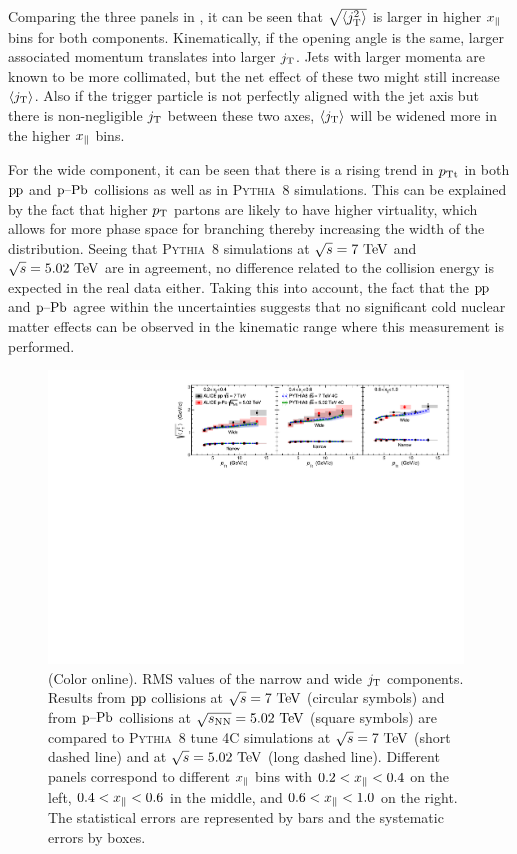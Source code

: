 Comparing the three panels in , it can be seen that $\sqrt{\left<j_{\rm T}^2\right>}$ is larger in higher $x_{\parallel}$ bins for both components. Kinematically, if the opening angle is the same, larger associated momentum translates into larger $j_{\rm T}$. Jets with larger momenta are known to be more collimated, but the net effect of these two might still increase $\left<j_{\rm T}\right>$. Also if the trigger particle is not perfectly aligned with the jet axis but there is non-negligible $j_{\rm T}$ between these two axes, $\left<j_{\rm T}\right>$ will be widened more in the higher $x_{\parallel}$ bins.

For the wide component, it can be seen that there is a rising trend in $p_{\rm Tt}$ in both $\mbox{p\kern-0.05em p}$ and $\mbox{p--Pb}$ collisions as well as in \textsc{Pythia}~8 simulations. This can be explained by the fact that higher $p_{\rm T}$ partons are likely to have higher virtuality, which allows for more phase space for branching thereby increasing the width of the distribution. Seeing that \textsc{Pythia}~8 simulations at $\sqrt{s} = 7~\mathrm{TeV}$ and $\sqrt{s} = 5.02~\mathrm{TeV}$ are in agreement, no difference related to the collision energy is expected in the real data either. Taking this into account, the fact that the $\mbox{p\kern-0.05em p}$ and $\mbox{p--Pb}$ agree within the uncertainties suggests that no significant cold nuclear matter effects can be observed in the kinematic range where this measurement is performed.

  \begin{figure}[t]
    \begin{center}
      \includegraphics[width = 0.98\textwidth]{figures/results/jt_RMS_finalFormUniformTextSize}
    \end{center}
    \caption{(Color online). RMS values of the narrow and wide $j_{\rm T}$ components. Results from $\mbox{p\kern-0.05em p}$ collisions at $\sqrt{s} = 7~\mathrm{TeV}$ (circular symbols) and from $\mbox{p--Pb}$ collisions at $\sqrt{s_{\mathrm{NN}}} = 5.02~\mathrm{TeV}$ (square symbols) are compared to \textsc{Pythia}~8 tune 4C simulations at $\sqrt{s} = 7~\mathrm{TeV}$ (short dashed line) and at $\sqrt{s} = 5.02~\mathrm{TeV}$ (long dashed line). Different panels correspond to different $x_{\parallel}$ bins with $0.2 < x_{\parallel} < 0.4$ on the left, $0.4 < x_{\parallel} < 0.6$ in the middle, and $0.6 < x_{\parallel} < 1.0$ on the right. The statistical errors are represented by bars and the systematic errors by boxes.}
    \label{fig:jtrms}
  \end{figure}
  

